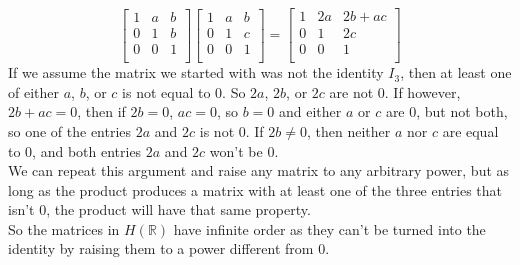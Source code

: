 \documentclass[12pt]{article}
\newcommand{\R}{\mathbb{R}}
\begin{document}
\begin{enumerate}[label=\textbf{\alph*.}]
\[\begin{bmatrix}
                1 & a & b \\
                0 & 1 & b \\
                0 & 0 & 1 \\
            \end{bmatrix}
            \begin{bmatrix}
                1 & a & b \\
                0 & 1 & c \\
                0 & 0 & 1 \\
            \end{bmatrix}
            = \begin{bmatrix}
                1 & 2a & 2b + ac \\
                0 & 1 & 2c \\
                0 & 0 & 1 \\
            \end{bmatrix} \]
            If we assume the matrix we started with was not the identity $I_3$,
            then at least one of either $a$, $b$, or $c$ is not equal to 0.
            So $2a$, $2b$, or $2c$ are not 0.
            If however, $2b + ac = 0$,
            then if $2b = 0$, $ac = 0$,
            so $b = 0$ and either $a$ or $c$ are 0, but not both,
            so one of the entries $2a$ and $2c$ is not 0.
            If $2b \neq 0$, then neither $a$ nor $c$ are equal to 0, and
            both entries $2a$ and $2c$ won't be 0. \\
            We can repeat this argument and raise any matrix to any
            arbitrary power,
            but as long as the product produces a matrix with at least one
            of the three entries that isn't 0, the product will have 
            that same property. \\
            So the matrices in $H(\R)$ have infinite order as they can't
            be turned into the identity by raising them to a power different
            from 0. 
    \end{enumerate}
\end{document}
